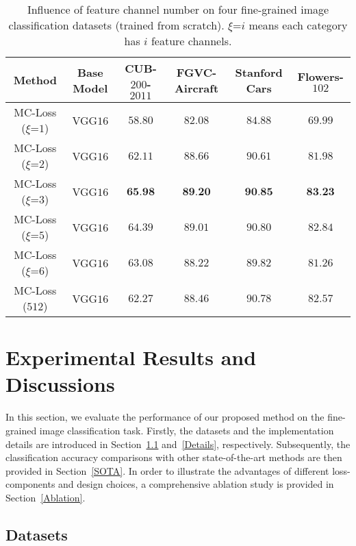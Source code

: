 \documentclass[journal]{IEEEtran}
\begin{document}
\begin{table*}[!t]
  \centering
  \small
\caption{Influence of feature channel number on four fine-grained image classification datasets (trained from scratch). $\xi$=$i$ means each category has $i$ feature channels.}
    \begin{tabular}{|c|c|c|c|c|c|}
    \hline
    Method              & Base Model   & CUB-$200$-$2011$ & FGVC-Aircraft     & Stanford Cars   & Flowers-$102$ \\
    \hline
    \hline
    MC-Loss ($\xi$=$1$) & VGG$16$      & $58.80$          & $82.08$           & $84.88$          & $69.99$ \\
MC-Loss ($\xi$=$2$) & VGG$16$      & $62.11$          & $88.66$           & $90.61$          & $81.98$ \\
MC-Loss ($\xi$=$3$) & VGG$16$      & $\textbf{65.98}$ & $\textbf{89.20}$  & $\textbf{90.85}$ & $\textbf{83.23}$ \\
MC-Loss ($\xi$=$5$) & VGG$16$      & $64.39$          & $89.01$           & $90.80$          & $82.84$ \\
MC-Loss ($\xi$=$6$) & VGG$16$      & $63.08$          & $88.22$           & $89.82$          & $81.26$ \\
    \hline
    \hline
    MC-Loss ($512$)     & VGG$16$      &$ 62.27$          & $88.46$           &$ 90.78 $         & $82.57$ \\
    \hline
    \end{tabular}\label{tab:mis_match}\end{table*}



\section{Experimental Results and Discussions}\label{Experiments}

In this section, we evaluate the performance of our proposed method on the fine-grained image classification task. Firstly, the datasets and the implementation details are introduced in Section~\ref{Datasets} and~\ref{Details}, respectively.  Subsequently, the classification accuracy comparisons with other state-of-the-art methods are then provided in Section~\ref{SOTA}. In order to illustrate the advantages of different loss-components and design choices, a comprehensive ablation study is provided in Section~\ref{Ablation}.    


\subsection{Datasets}\label{Datasets}
\end{document}
